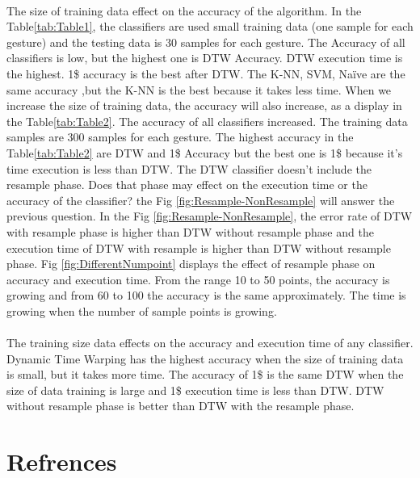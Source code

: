 \documentclass[twoside]{article}
\begin{document}
\begin{multicols}{2}
\paragraph{}The size of training data effect on the accuracy of the algorithm. In the Table\ref{tab:Table1}, the classifiers are used small training data (one sample for each gesture) and the testing data is 30 samples for each gesture. The Accuracy of all classifiers is low, but the highest one is DTW Accuracy. DTW execution time is the highest. 1\$ accuracy is the best after DTW. The K-NN, SVM, Naïve are the same accuracy ,but the K-NN is the best because it takes less time.
When we increase the size of training data, the accuracy will also increase, as a display in the Table\ref{tab:Table2}. The accuracy of all classifiers increased. The training data samples are 300 samples for each gesture. The highest accuracy in the Table\ref{tab:Table2} are DTW and 1\$ Accuracy but the best one is 1\$ because it's time execution is less than DTW.
The DTW classifier doesn't include the resample phase. Does that phase may effect on the execution time or the accuracy of the classifier? the Fig \ref{fig:Resample-NonResample} will answer the previous question. In the Fig \ref{fig:Resample-NonResample}, the error rate of DTW with resample phase is higher than DTW without resample phase and the execution time of DTW with resample is higher than DTW without resample phase.
Fig \ref{fig:DifferentNumpoint} displays the effect of resample phase on accuracy and execution time. From the range 10 to 50 points, the accuracy is growing and from 60 to 100 the accuracy is the same approximately. The time is growing when the number of sample points is growing.
\paragraph{}The training size data effects on the accuracy and execution time of any classifier.  Dynamic Time Warping has the highest accuracy when the size of training data is small, but it takes more time. The accuracy of 1\$ is the same DTW when the size of data training is large and 1\$ execution time is less than DTW. DTW without resample phase is better than DTW with the resample phase.
\clearpage
\section{Refrences}
\end{multicols}
\end{document}
